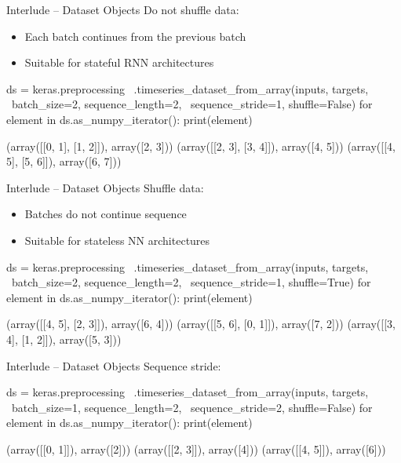 \documentclass[ignorenonframetext,xcolor=x11names]{beamer}
\begin{document}
\begin{frame}[fragile]{Interlude -- Dataset Objects}
Do not shuffle data:
\begin{itemize}
    \item Each batch continues from the previous batch
    \item Suitable for stateful RNN architectures
\end{itemize}

\begin{pythoncode}
ds = keras.preprocessing \
    .timeseries_dataset_from_array(inputs, targets, \
     batch_size=2, sequence_length=2, \
     sequence_stride=1, shuffle=False)
for element in ds.as_numpy_iterator():
     print(element)

(array([[0, 1],
       [1, 2]]), array([2, 3]))
(array([[2, 3],
       [3, 4]]), array([4, 5]))
(array([[4, 5],
       [5, 6]]), array([6, 7]))
\end{pythoncode}
\end{frame}

\begin{frame}[fragile]{Interlude -- Dataset Objects}
Shuffle data:
\begin{itemize}
    \item Batches do not continue sequence
    \item Suitable for stateless NN architectures
\end{itemize}

\begin{pythoncode}
ds = keras.preprocessing \
    .timeseries_dataset_from_array(inputs, targets, \
     batch_size=2, sequence_length=2, \
     sequence_stride=1, shuffle=True)
for element in ds.as_numpy_iterator():
     print(element)

(array([[4, 5],
       [2, 3]]), array([6, 4]))
(array([[5, 6],
       [0, 1]]), array([7, 2]))
(array([[3, 4],
       [1, 2]]), array([5, 3]))
\end{pythoncode}
\end{frame}

\begin{frame}[fragile]{Interlude -- Dataset Objects}
Sequence stride:

\begin{pythoncode}
ds = keras.preprocessing \
    .timeseries_dataset_from_array(inputs, targets, \
     batch_size=1, sequence_length=2, \
     sequence_stride=2, shuffle=False)
for element in ds.as_numpy_iterator():
     print(element)

(array([[0, 1]]), array([2]))
(array([[2, 3]]), array([4]))
(array([[4, 5]]), array([6]))
\end{pythoncode}
\end{frame}
\end{document}
